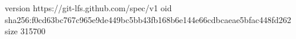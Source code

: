 version https://git-lfs.github.com/spec/v1
oid sha256:f0cd63bc767c965e9de449bc5bb43fb168b6e144e66cdbcaeae5bfac448fd262
size 315700
